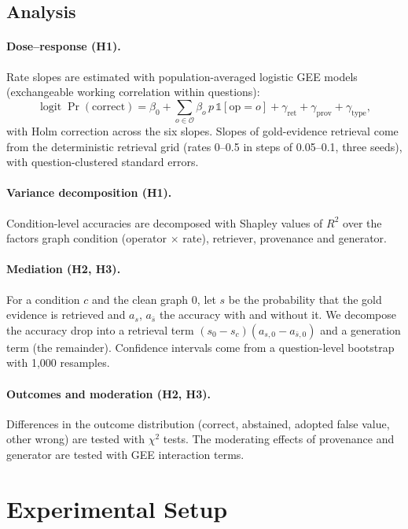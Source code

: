 \documentclass[11pt]{article}
\begin{document}
\subsection{Analysis}
\paragraph{Dose--response (H1).} Rate slopes are estimated with population-averaged logistic GEE models (exchangeable working correlation within questions):
\begin{equation}
\operatorname{logit}\Pr(\text{correct}) = \beta_0 + \sum_{o\in\mathcal{O}} \beta_o\, p\,\mathbb{1}[\text{op}=o] + \gamma_{\text{ret}} + \gamma_{\text{prov}} + \gamma_{\text{type}},
\end{equation}
with Holm correction across the six slopes. Slopes of gold-evidence retrieval come from the deterministic retrieval grid (rates 0--0.5 in steps of 0.05--0.1, three seeds), with question-clustered standard errors.

\paragraph{Variance decomposition (H1).} Condition-level accuracies are decomposed with Shapley values of $R^2$ over the factors graph condition (operator $\times$ rate), retriever, provenance and generator.

\paragraph{Mediation (H2, H3).} For a condition $c$ and the clean graph $0$, let $s$ be the probability that the gold evidence is retrieved and $a_s$, $a_{\bar s}$ the accuracy with and without it. We decompose the accuracy drop into a retrieval term $(s_0 - s_c)(a_{s,0} - a_{\bar s,0})$ and a generation term (the remainder). Confidence intervals come from a question-level bootstrap with 1,000 resamples.

\paragraph{Outcomes and moderation (H2, H3).} Differences in the outcome distribution (correct, abstained, adopted false value, other wrong) are tested with $\chi^2$ tests. The moderating effects of provenance and generator are tested with GEE interaction terms.

\section{Experimental Setup}\label{sec:setup}
\end{document}
